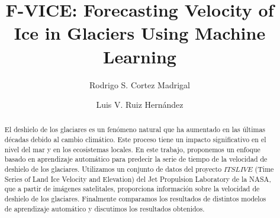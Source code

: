 \documentclass[sigconf,authordraft,language=spanish]{acmart}
\begin{document}
\title{F-VICE: Forecasting Velocity of Ice in Glaciers Using
  Machine Learning}

\author{Rodrigo S. Cortez Madrigal}
\authornotemark[1]

\author{Luis V. Ruiz Hernández}
\authornotemark[1]


\begin{abstract}
  El deshielo de los glaciares es un fenómeno natural
  que ha aumentado en las últimas décadas debido al cambio climático.
  Este proceso tiene un impacto significativo en el nivel del mar y en los ecosistemas locales.  
  En este trabajo, proponemos un enfoque basado en aprendizaje automático para predecir la serie de tiempo de la velocidad de deshielo de los glaciares. 
  Utilizamos un conjunto de datos del proyecto $ITSLIVE$ (Time Series of Land Ice Velocity and Elevation) del Jet Propulsion Laboratory de la NASA, que a partir de imágenes satelitales, proporciona información sobre la velocidad de deshielo de los glaciares.
  Finalmente comparamos los resultados de distintos modelos de aprendizaje automático y discutimos los resultados obtenidos.
\end{abstract}
\end{document}
